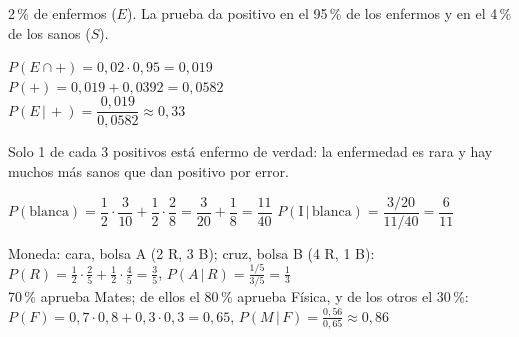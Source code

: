 \documentclass[11pt,a4paper]{article}
\newcommand{\heavy}{\fontseries{eb}\selectfont}
\newcommand{\cond}{\,|\,}
\begin{document}
\vfill
\begin{exemple}
{\small 2\,\% de enfermos ($E$). La prueba da positivo en el 95\,\% de los enfermos y en el 4\,\% de los sanos ($S$).}\par\smallskip
\begin{minipage}[c]{0.5\linewidth}\centering
{}
\end{minipage}\hfill
\begin{minipage}[c]{0.48\linewidth}
$P(E\cap+)=0{,}02\cdot0{,}95=0{,}019$\\[4pt]
$P(+)=0{,}019+0{,}0392=\boxed{0{,}0582}$\\[4pt]
$P(E\cond+)=\dfrac{0{,}019}{0{,}0582}\approx\boxed{0{,}33}$
\end{minipage}
\end{exemple}

\vfill
\begin{compte}[¡Sorprendente!]
Solo 1 de cada 3 positivos está enfermo de verdad: la enfermedad es rara y hay muchos más sanos que dan positivo por error.
\end{compte}

\vfill
\begin{exemple}
$P(\text{blanca})=\dfrac12\cdot\dfrac3{10}+\dfrac12\cdot\dfrac28=\dfrac3{20}+\dfrac18=\boxed{\dfrac{11}{40}}$ \qquad $P(\text{I}\cond\text{blanca})=\dfrac{3/20}{11/40}=\boxed{\dfrac6{11}}$
\end{exemple}

\vfill
\begin{exemple}[Exemples]
Moneda: cara, bolsa A (2 R, 3 B); cruz, bolsa B (4 R, 1 B): \ \\ \hspace*{1em}$P(R)=\frac12\cdot\frac25+\frac12\cdot\frac45=\frac35$, \quad $P(A\cond R)=\frac{1/5}{3/5}=\frac13$\\[4pt]
70\,\% aprueba Mates; de ellos el 80\,\% aprueba Física, y de los otros el 30\,\%:\\ \hspace*{1em}$P(F)=0{,}7\cdot0{,}8+0{,}3\cdot0{,}3=0{,}65$, \quad $P(M\cond F)=\frac{0{,}56}{0{,}65}\approx0{,}86$
\end{exemple}
\end{document}
